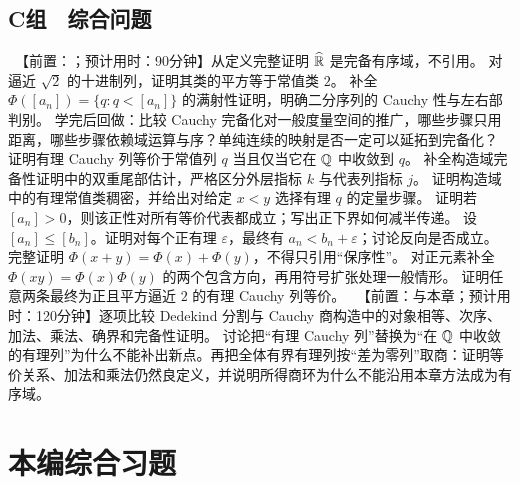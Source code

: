 \subsection*{C组　综合问题}
\begin{enumerate}[label=\textbf{\thechapter.\arabic*.},resume]
  \ 【前置：；预计用时：90分钟】从定义完整证明 \(\widehat{\mathbb{R}}\) 是完备有序域，不引用。
  对逼近 \(\sqrt2\) 的十进制列，证明其类的平方等于常值类 \(2\)。
  补全 \(\Phi([a_n])=\{q:q<[a_n]\}\) 的满射性证明，明确二分序列的 Cauchy 性与左右部判别。
  学完后回做：比较 Cauchy 完备化对一般度量空间的推广，哪些步骤只用距离，哪些步骤依赖域运算与序？单纯连续的映射是否一定可以延拓到完备化？
  证明有理 Cauchy 列等价于常值列 \(q\) 当且仅当它在 \(\mathbb{Q}\) 中收敛到 \(q\)。
  补全构造域完备性证明中的双重尾部估计，严格区分外层指标 \(k\) 与代表列指标 \(j\)。
  证明构造域中的有理常值类稠密，并给出对给定 \(x<y\) 选择有理 \(q\) 的定量步骤。
  证明若 \([a_n]>0\)，则该正性对所有等价代表都成立；写出正下界如何减半传递。
  设 \([a_n]\le[b_n]\)。证明对每个正有理 \(\varepsilon\)，最终有 \(a_n<b_n+\varepsilon\)；讨论反向是否成立。
  完整证明 \(\Phi(x+y)=\Phi(x)+\Phi(y)\)，不得只引用“保序性”。
  对正元素补全 \(\Phi(xy)=\Phi(x)\Phi(y)\) 的两个包含方向，再用符号扩张处理一般情形。
  证明任意两条最终为正且平方逼近 \(2\) 的有理 Cauchy 列等价。
  \ 【前置：与本章；预计用时：120分钟】逐项比较 Dedekind 分割与 Cauchy 商构造中的对象相等、次序、加法、乘法、确界和完备性证明。
  讨论把“有理 Cauchy 列”替换为“在 \(\mathbb{Q}\) 中收敛的有理列”为什么不能补出新点。再把全体有界有理列按“差为零列”取商：证明等价关系、加法和乘法仍然良定义，并说明所得商环为什么不能沿用本章方法成为有序域。
\end{enumerate}

\section*{本编综合习题}

